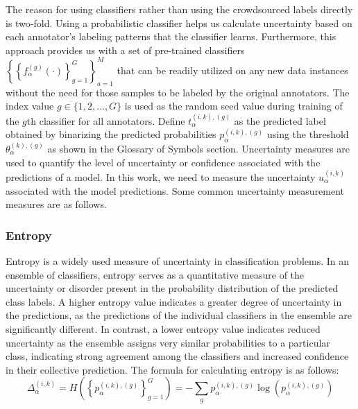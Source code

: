 The reason for using classifiers rather than using the crowdsourced labels directly is two-fold. Using a probabilistic classifier helps us calculate uncertainty based on each annotator's labeling patterns that the classifier learns. Furthermore, this approach provides us with a set of pre-trained classifiers $\left\{ \left\{f_{\alpha}^{(g)}(\cdot) \right\}_{g=1}^G  \right\}_{a=1}^{M} $ that can be readily utilized on any new data instances without the need for those samples to be labeled by the original annotators.
The index value $g  \in \{1,2,\dots,G\} $ is used as the random seed value during training of the $g$\-th classifier for all annotators.
Define $t_{\alpha}^{(i,k),(g)} $ as the predicted label obtained by binarizing the predicted probabilities $p_{\alpha}^{ (i,k),(g)} $ using the threshold $\theta_{\alpha}^{(k),(g)} $ as shown in the Glossary of Symbols section.
Uncertainty measures are used to quantify the level of uncertainty or confidence associated with the predictions of a model. In this work, we need to measure the uncertainty $u_{\alpha}^{(i,k)}$ associated with the model predictions. Some common uncertainty measurement measures are as follows.

\subsubsection{Entropy}
Entropy is a widely used measure of uncertainty in classification problems. In an ensemble of classifiers, entropy serves as a quantitative measure of the uncertainty or disorder present in the probability distribution of the predicted class labels. A higher entropy value indicates a greater degree of uncertainty in the predictions, as the predictions of the individual classifiers in the ensemble are significantly different. In contrast, a lower entropy value indicates reduced uncertainty as the ensemble assigns very similar probabilities to a particular class, indicating strong agreement among the classifiers and increased confidence in their collective prediction. The formula for calculating entropy is as follows:
\begin{equation}
\Delta_{\alpha}^{(i,k)}=H\left(\left\{p_{\alpha}^{(i,k),(g)}\right\}_{g=1}^{G}\right)=-\sum_{g}{p_{\alpha}^{(i,k),(g)} \log\left(p_{\alpha}^{(i,k),(g)}\right)}
\label{eq:crowd.Eq.5.uncertainty}
\end{equation}

